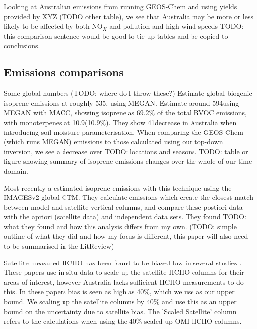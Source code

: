         Looking at Australian emissions from running GEOS-Chem and using yields provided by XYZ (TODO other table), we see that Australia may be more or less likely to be affected by both NO$_X$ and pollution and high wind speeds TODO: this comparison sentence would be good to tie up tables and be copied to conclusions.  
        
  \subsection{Emissions comparisons}
    \label{BioIsop:Results:Emissions}
  
    Some global numbers (TODO: where do I throw these?)
    \textcite{Guenther2012} Estimate global biogenic isoprene emissions at roughly 535\tgpyr, using MEGAN.
    \textcite{Sindelarova2014} Estimate around 594\tgpyr using MEGAN with MACC, showing isoprene as 69.2\% of the total BVOC emissions, with monoterpenes at 10.9\tgpyr (10.9\%).
    They show 41\tgpyr decrease in Australia when introducing soil moisture parameterisation.
    When comparing the GEOS-Chem (which runs MEGAN) emissions to those calculated using our top-down inversion, we see a decrease over TODO: locations and seasons.
    TODO: table or figure showing summary of isoprene emissions changes over the whole of our time domain.
    
    Most recently a \textcite{Bauwens2016} estimated isoprene emissions with this technique using the IMAGESv2 global CTM.
    They calculate emissions which create the closest match between model and satellite vertical columns, and compare these postiori data with the apriori (satellite data) and independent data sets.
    They found TODO: what they found and how this analysis differs from my own.
    (TODO: simple outline of what they did and how my focus is different, this paper will also need to be summarised in the LitReview)
    
    Satellite measured HCHO has been found to be biased low in several studies \textcite[eg.][]{Zhu2016,DeSmedt2015,Barkley2013}.
    These papers use in-situ data to scale up the satellite HCHO columns for their areas of interest, however Australia lacks sufficient HCHO measurements to do this.
    In these papers bias is seen as high as 40\%, which we use as our upper bound.
    We scaling up the satellite columns by 40\% and use this as an upper bound on the uncertainty due to satellite bias.
    The 'Scaled Satellite' column refers to the calculations when using the 40\% scaled up OMI HCHO columns. %
    
